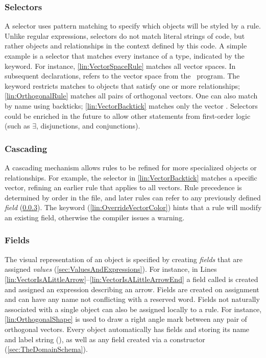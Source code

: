 \subsubsection{Selectors}
\label{sec:Selectors}

A selector uses pattern matching to specify which objects will be styled by a rule.  Unlike regular expressions, selectors do not match literal strings of \Substance{} code, but rather objects and relationships in the context defined by this code.  A simple example is a selector that matches every instance of a type, indicated by the  keyword.  For instance, \cref{lin:VectorSpaceRule} matches all vector spaces.  In subsequent declarations,  refers to the vector space  from the \Substance\ program.  The  keyword restricts matches to objects that satisfy one or more relationships; \eg \cref{lin:OrthogonalRule} matches all pairs of orthogonal vectors.  One can also match by name using backticks; \eg \cref{lin:VectorBacktick} matches only the vector .  Selectors could be enriched in the future to allow other statements from first-order logic (such as \(\exists\), disjunctions, and conjunctions).

\subsubsection{Cascading}
\label{sec:Cascading}

A cascading mechanism allows rules to be refined for more specialized objects or relationships.  For example, the selector in \cref{lin:VectorBacktick} matches a specific vector, refining an earlier rule that applies to all vectors.  Rule precedence is determined by order in the \Style{} file, and later rules can refer to any previously defined \emph{field} (\cref{sec:Fields}).  The  keyword (\cref{lin:OverrideVectorColor}) hints that a rule will modify an existing field, otherwise the compiler issues a warning.


\subsubsection{Fields}
\label{sec:Fields}

The visual representation of an object is specified by creating \emph{fields} that are assigned \emph{values} (\cref{sec:ValuesAndExpressions}).  For instance, in Lines \ref{lin:VectorIsALittleArrow}--\ref{lin:VectorIsALittleArrowEnd} a field called  is created and assigned an expression describing an arrow.  Fields are created on assignment and can have any name not conflicting with a reserved word.  Fields not naturally associated with a single object can also be assigned locally to a rule. For instance, \cref{lin:OrthogonalShape} is used to draw a right angle mark between any pair of orthogonal vectors.  Every object automatically has fields  and  storing its \Substance{} name and label string (\resp), as well as any field created via a constructor (\cref{sec:TheDomainSchema}).


